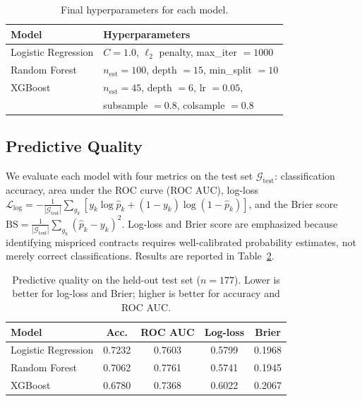 \begin{table}[h]
\centering
\caption{Final hyperparameters for each model.}
\label{tab:hyperparams}
\begin{tabular}{ll}
\toprule
\textbf{Model} & \textbf{Hyperparameters} \\
\midrule
Logistic Regression & $C=1.0$, $\ell_2$ penalty, max\_iter $=1000$ \\
Random Forest       & $n_{\text{est}}=100$, depth $=15$, min\_split $=10$ \\
XGBoost             & $n_{\text{est}}=45$, depth $=6$, lr $=0.05$, \\
                    & subsample $=0.8$, colsample $=0.8$ \\
\bottomrule
\end{tabular}
\end{table}

\subsection{Predictive Quality}

We evaluate each model with four metrics on the test set
$\mathcal{G}_{\text{test}}$: classification accuracy, area under the
ROC curve (ROC AUC), log-loss
$\mathcal{L}_{\text{log}} = -\tfrac{1}{|\mathcal{G}_{\text{test}}|}
\sum_{g_k}[y_k \log \hat{p}_k + (1-y_k)\log(1-\hat{p}_k)]$, and the
Brier score
$\text{BS} = \tfrac{1}{|\mathcal{G}_{\text{test}}|}
\sum_{g_k}(\hat{p}_k - y_k)^2$. Log-loss and Brier score are
emphasized because identifying mispriced contracts requires
well-calibrated probability estimates, not merely correct
classifications. Results are reported in
Table~\ref{tab:predictive}.

\begin{table}[h]
\centering
\caption{Predictive quality on the held-out test set ($n=177$). Lower
is better for log-loss and Brier; higher is better for accuracy and
ROC AUC.}
\label{tab:predictive}
\begin{tabular}{lcccc}
\toprule
\textbf{Model} & \textbf{Acc.} & \textbf{ROC AUC} & \textbf{Log-loss} & \textbf{Brier} \\
\midrule
Logistic Regression & 0.7232 & 0.7603 & 0.5799 & 0.1968 \\
Random Forest       & 0.7062 & 0.7761 & 0.5741 & 0.1945 \\
XGBoost             & 0.6780 & 0.7368 & 0.6022 & 0.2067 \\
\bottomrule
\end{tabular}
\end{table}


